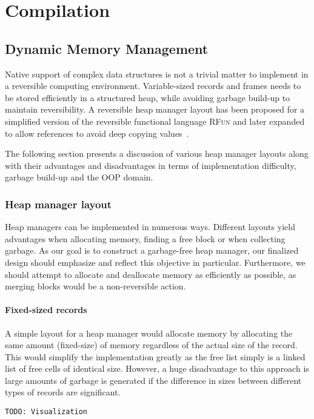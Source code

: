 \chapter{Compilation}

\section{Dynamic Memory Management}
Native support of complex data structures is not a trivial matter to implement in a reversible computing environment. Variable-sized records and frames needs to be stored efficiently in a structured heap, while avoiding garbage build-up to maintain reversibility. A reversible heap manager layout has been proposed for a simplified version of the reversible functional language \textsc{RFun} and later expanded to allow references to avoid deep copying values~\cite{ha:heap, ty:rfun, tm:refcounting}.

The following section presents a discussion of various heap manager layouts along with their advantages and disadvantages in terms of implementation difficulty, garbage build-up and the OOP domain. 

\subsection{Heap manager layout}
Heap managers can be implemented in numerous ways. Different layouts yield advantages when allocating memory, finding a free block or when collecting garbage. As our goal is to construct a garbage-free heap manager, our finalized design should emphasize and reflect this objective in particular. Furthermore, we should attempt to allocate and deallocate memory as efficiently as possible, as merging blocks would be a non-reversible action.

\subsubsection{Fixed-sized records}
A simple layout for a heap manager would allocate memory by allocating the same amount (fixed-size) of memory regardless of the actual size of the record. This would simplify the implementation greatly as the free list simply is a linked list of free cells of identical size. However, a huge disadvantage to this approach is large amounts of garbage is generated if the difference in sizes between different types of records are significant.

\texttt{TODO: Visualization}


